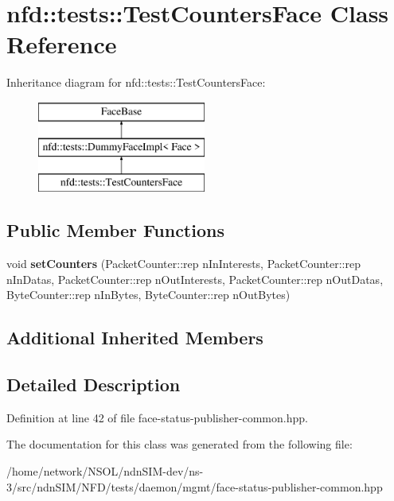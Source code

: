 \hypertarget{classnfd_1_1tests_1_1TestCountersFace}{}\section{nfd\+:\+:tests\+:\+:Test\+Counters\+Face Class Reference}
\label{classnfd_1_1tests_1_1TestCountersFace}
Inheritance diagram for nfd\+:\+:tests\+:\+:Test\+Counters\+Face\+:\begin{figure}[H]
\begin{center}
\leavevmode
\includegraphics[height=3.000000cm]{classnfd_1_1tests_1_1TestCountersFace}
\end{center}
\end{figure}
\subsection*{Public Member Functions}
\begin{DoxyCompactItemize}
\item 
void {\bfseries set\+Counters} (Packet\+Counter\+::rep n\+In\+Interests, Packet\+Counter\+::rep n\+In\+Datas, Packet\+Counter\+::rep n\+Out\+Interests, Packet\+Counter\+::rep n\+Out\+Datas, Byte\+Counter\+::rep n\+In\+Bytes, Byte\+Counter\+::rep n\+Out\+Bytes)\hypertarget{classnfd_1_1tests_1_1TestCountersFace_aaea3abc341787a0707ec1afd7e0334f6}{}\label{classnfd_1_1tests_1_1TestCountersFace_aaea3abc341787a0707ec1afd7e0334f6}

\end{DoxyCompactItemize}
\subsection*{Additional Inherited Members}


\subsection{Detailed Description}


Definition at line 42 of file face-\/status-\/publisher-\/common.\+hpp.



The documentation for this class was generated from the following file\+:\begin{DoxyCompactItemize}
\item 
/home/network/\+N\+S\+O\+L/ndn\+S\+I\+M-\/dev/ns-\/3/src/ndn\+S\+I\+M/\+N\+F\+D/tests/daemon/mgmt/face-\/status-\/publisher-\/common.\+hpp\end{DoxyCompactItemize}
